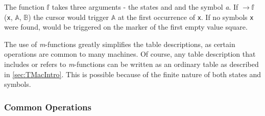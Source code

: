 \documentclass[Master.tex]{subfiles}
\begin{document}
\medskip

The function $\mathbb{f}$ takes three arguments - the states  and  and the symbol \textit{a}. If $\rightarrow \mathbb{f}$(\texttt{x}, $\mathbb{A}$, $\mathbb{B}$) the cursor would trigger $\mathbb{A}$ at the first occurrence of \texttt{x}. If no symbols \texttt{x} were found,  would be triggered on the marker of the first empty value square.

The use of \textit{m}-functions greatly simplifies the table descriptions, as certain operations are common to many machines. Of course, any table description that includes or refers to \textit{m}-functions can be written as an ordinary table as described in \cref{sec:TMacIntro}. This is possible because of the finite nature of both states and symbols.

\subsubsection{Common Operations}
\end{document}
